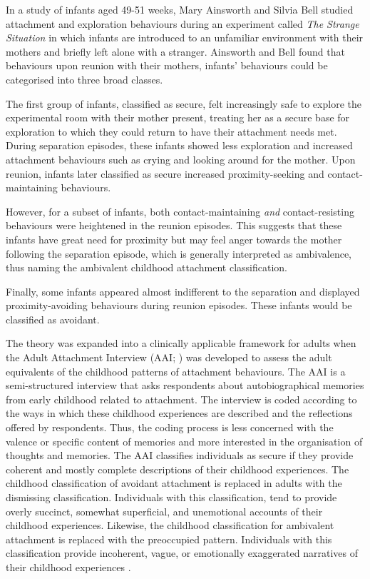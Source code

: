 \documentclass[12pt]{report}
\begin{document}
In a study of infants aged 49-51 weeks, Mary Ainsworth and Silvia Bell studied attachment and exploration behaviours during an experiment called \textit{The Strange Situation} in which infants are introduced to an unfamiliar environment with their mothers and briefly left alone with a stranger.
Ainsworth and Bell found that behaviours upon reunion with their mothers, infants' behaviours could be categorised into three broad classes.

The first group of infants, classified as secure, felt increasingly safe to explore the experimental room with their mother present, treating her as a secure base for exploration to which they could return to have their attachment needs met.
During separation episodes, these infants showed less exploration and increased attachment behaviours such as crying and looking around for the mother. Upon reunion, infants later classified as secure increased proximity-seeking and contact-maintaining behaviours.

However, for a subset of infants, both contact-maintaining \textit{and} contact-resisting behaviours were heightened in the reunion episodes.
This suggests that these infants have great need for proximity but may feel anger towards the mother following the separation episode, which is generally interpreted as ambivalence, thus naming the ambivalent childhood attachment classification.

Finally, some infants appeared almost indifferent to the separation and displayed proximity-avoiding behaviours during reunion episodes. These infants would be classified as avoidant.

The theory was expanded into a clinically applicable framework for adults when the Adult Attachment Interview (AAI; \cite{AAITest}) was developed to assess the adult equivalents of the childhood patterns of attachment behaviours.
The AAI is a semi-structured interview that asks respondents about autobiographical memories from early childhood related to attachment.
The interview is coded according to the ways in which these childhood experiences are described and the reflections offered by respondents.
Thus, the coding process is less concerned with the valence or specific content of memories and more interested in the organisation of thoughts and memories.
The AAI classifies individuals as secure if they provide coherent and mostly complete descriptions of their childhood experiences.
The childhood classification of avoidant attachment is replaced in adults with the dismissing classification.
Individuals with this classification, tend to provide overly succinct, somewhat superficial, and unemotional accounts of their childhood experiences.
Likewise, the childhood classification for ambivalent attachment is replaced with the preoccupied pattern.
Individuals with this classification provide incoherent, vague, or emotionally exaggerated narratives of their childhood experiences \cite{Hesse1999, AAITest}.
\end{document}
